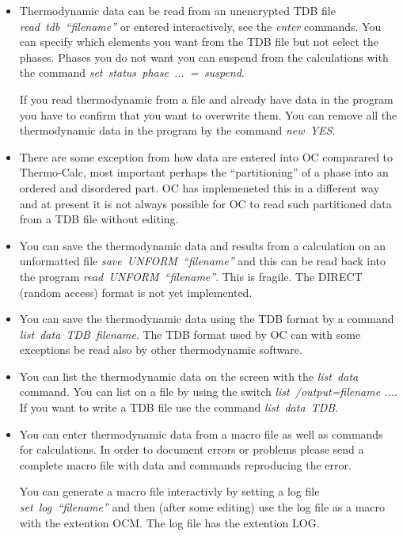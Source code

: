 \documentclass[12pt]{article}
\begin{document}
\begin{itemize}
\item Thermodynamic data can be read from an unencrypted TDB file {\em
  read~tdb~``filename''} or entered interactively, see the {\em enter}
  commands.  You can specify which elements you want from the TDB file
  but not select the phases.  Phases you do not want you can suspend
  from the calculations with the command {\em
    set~status~phase~...~=~suspend}.

  If you read thermodynamic from a file and already have data in the
  program you have to confirm that you want to overwrite them.  You can
  remove all the thermodynamic data in the program by the command {\em
    new~YES}.

\item There are some exception from how data are entered into OC
  comparared to Thermo-Calc, most important perhaps the
  ``partitioning'' of a phase into an ordered and disordered part.  OC
  has implemeneted this in a different way and at present it is not
  always possible for OC to read such partitioned data from a TDB file
  without editing.

\item You can save the thermodynamic data and results from a
  calculation on an unformatted file {\em save~UNFORM~``filename''}
  and this can be read back into the program {\em
    read~UNFORM~``filename''}.  This is fragile.  The DIRECT (random
  access) format is not yet implemented.

\item You can save the thermodynamic data using the TDB format by a
  command {\em list~data~TDB~filename}.  The TDB format used by OC can
  with some exceptions be read also by other thermodynamic software.

\item You can list the thermodynamic data on the screen with the {\em
  list~data} command.  You can list on a file by using the switch {\em
  list~/output=filename ...}.  If you want to write a TDB file use the
  command {\em list~data~TDB}.
  
\item You can enter thermodynamic data from a macro file as well as
  commands for calculations.  In order to document errors or problems
  please send a complete macro file with data and commands reproducing
  the error.  

  You can generate a macro file interactivly by setting a log file
  {\em set~log~``filename''} and then (after some editing) use the log
  file as a macro with the extention OCM.  The log file has the
  extention LOG.

\end{itemize}
\end{document}
